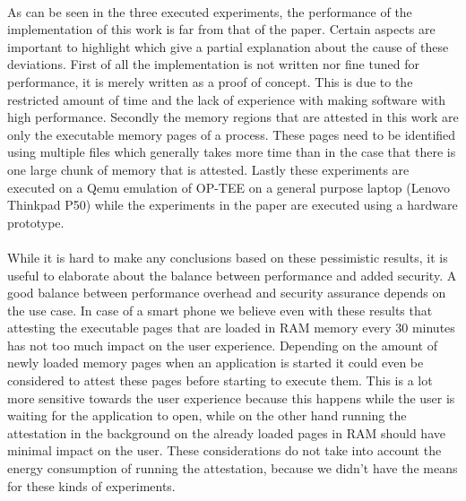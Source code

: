 
\paragraph*{}%
As can be seen in the three executed experiments, the performance of the implementation of this work is far from that of the paper. Certain aspects are important to highlight which give a partial explanation about the cause of these deviations. First of all the implementation is not written nor fine tuned for performance, it is merely written as a proof of concept. This is due to the restricted amount of time and the lack of experience with making software with high performance. Secondly the memory regions that are attested in this work are only the executable memory pages of a process. These pages need to be identified using multiple files which generally takes more time than in the case that there is one large chunk of memory that is attested. Lastly these experiments are executed on a Qemu emulation of OP-TEE on a general purpose laptop (Lenovo Thinkpad P50) while the experiments in the paper are executed using a hardware prototype. 

\paragraph*{}%
While it is hard to make any conclusions based on these pessimistic results, it is useful to elaborate about the balance between performance and added security. A good balance between performance overhead and security assurance depends on the use case. In case of a smart phone we believe even with these results that attesting the executable pages that are loaded in RAM memory every 30 minutes has not too much impact on the user experience. Depending on the amount of newly loaded memory pages when an application is started it could even be considered to attest these pages before starting to execute them. This is a lot more sensitive towards the user experience because this happens while the user is waiting for the application to open, while on the other hand running the attestation in the background on the already loaded pages in RAM should have minimal impact on the user. These considerations do not take into account the energy consumption of running the attestation, because we didn't have the means for these kinds of experiments.

